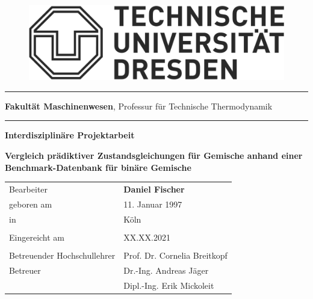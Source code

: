 \documentclass[../thesis.tex]{subfiles}
\begin{document}
\begin{titlepage}
	\begin{addmargin}[22mm]{0mm}
		\begin{figure}[t]
			\hspace*{5mm}\includegraphics[scale=0.35]{figs/Logo.png} \vspace{-8mm}
		\end{figure}
		\rule{140mm}{.4pt}
		\vspace{0.4mm}

		\scriptsize { {\bfseries Fakultät Maschinenwesen},
			Professur für Technische Thermodynamik}
		\vspace{-1.4mm}

		\rule{140mm}{.4pt}
		\vspace{2cm}

		{\Large \bfseries Interdisziplinäre Projektarbeit}
		\vspace{2cm}

		{\LARGE \bfseries Vergleich prädiktiver Zustandsgleichungen für Gemische anhand einer Benchmark-Datenbank für binäre Gemische \par}
		\vspace{2cm}
		\begin{addmargin}[-2mm]{0mm}
			\large
			\begin{tabular}{l l}
			  Bearbeiter                   & {\bfseries Daniel Fischer} \\
			  geboren am                   & 11. Januar 1997 \\
			  in                           & Köln \\ \\
			  Eingereicht am               & XX.XX.2021 \\ \\
			  Betreuender Hochschullehrer  & Prof. Dr. Cornelia Breitkopf \\
			  Betreuer                     & Dr.-Ing. Andreas Jäger  \\
			  							   & Dipl.-Ing. Erik Mickoleit \\
			\end{tabular}
		\end{addmargin}
	\end{addmargin}
\end{titlepage}
\end{document}
